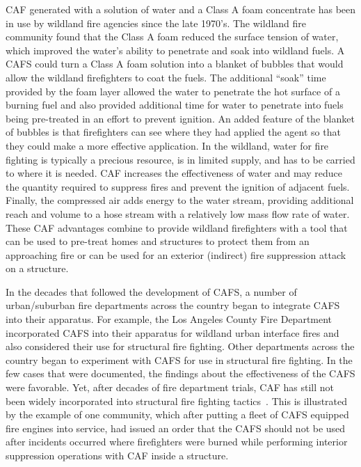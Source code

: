 \documentclass[12pt,oneside]{book}
\begin{document}
CAF generated with a solution of water and a Class A foam concentrate has been in use by wildland fire agencies since the late 1970's. The wildland fire community found that the Class A foam reduced the surface tension of water, which improved the water's ability to penetrate and soak into wildland fuels. A CAFS could turn a Class A foam solution into a blanket of bubbles that would allow the wildland firefighters to coat the fuels. The additional ``soak'' time provided by the foam layer allowed the water to penetrate the hot surface of a burning fuel and also provided additional time for water to penetrate into fuels being pre-treated in an effort to prevent ignition. An added feature of the blanket of bubbles is that firefighters can see where they had applied the agent so that they could make a more effective application. In the wildland, water for fire fighting is typically a precious resource, is in limited supply, and has to be carried to where it is needed. CAF increases the effectiveness of water and may reduce the quantity required to suppress fires and prevent the ignition of adjacent fuels. Finally, the compressed air adds energy to the water stream, providing additional reach and volume to a hose stream with a relatively low mass flow rate of water. These CAF advantages combine to provide wildland firefighters with a tool that can be used to pre-treat homes and structures to protect them from an approaching fire or can be used for an exterior (indirect) fire suppression attack on a structure.

In the decades that followed the development of CAFS, a number of urban/suburban fire departments across the country began to integrate CAFS into their apparatus. For example, the Los Angeles County Fire Department incorporated CAFS into their apparatus for wildland urban interface fires and also considered their use for structural fire fighting. Other departments across the country began to experiment with CAFS for use in structural fire fighting. In the few cases that were documented, the findings about the effectiveness of the CAFS were favorable. Yet, after decades of fire department trials, CAF has still not been widely incorporated into structural fire fighting tactics~\cite{USFA:CAFS,Lorh:2002}. This is illustrated by the example of one community, which after putting a fleet of CAFS equipped fire engines into service, had issued an order that the CAFS should not be used after incidents occurred where firefighters were burned while performing interior suppression operations with CAF inside a structure.
\end{document}
